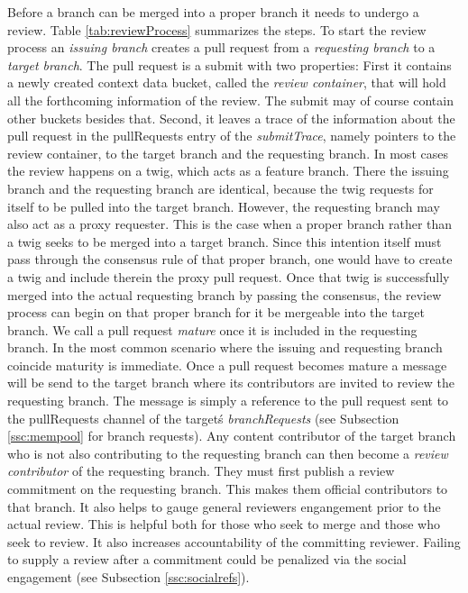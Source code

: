 \documentclass[14pt]{article}
\begin{document}
Before a branch can be merged into a proper branch it needs to undergo a review. Table \ref{tab:reviewProcess} summarizes the steps.
To start the review process an \textit{issuing branch} creates a pull request from a \textit{requesting branch} to a \textit{target branch}. The pull request is a submit with two properties: First it contains a newly created context data bucket, called the \textit{review container}, that will hold all the forthcoming information of the review. The submit may of course contain other buckets besides that. Second, it leaves a trace of the information about the pull request in the pullRequests entry of the \textit{submitTrace}, namely pointers to the review container, to the target branch and the requesting branch. In most cases the review happens on a twig, which acts as a feature branch. There the issuing branch and the requesting branch are identical, because the twig requests for itself to be pulled into the target branch. However, the requesting branch may also act as a proxy requester. This is the case when a proper branch rather than a twig seeks to be merged into a target branch. Since this intention itself must pass through the consensus rule of that proper branch, one would have to create a twig and include therein the proxy pull request. Once that twig is successfully merged into the actual requesting branch by passing the consensus, the review process can begin on that proper branch for it be mergeable into the target branch. We call a pull request \textit{mature} once it is included in the requesting branch. In the most common scenario where the issuing and requesting branch coincide maturity is immediate. 
Once a pull request becomes mature a message will be send to the target branch  where its contributors are invited to review the requesting branch. The message is simply a reference to the pull request sent to the pullRequests channel of the target\'s \textit{branchRequests} (see Subsection \ref{ssc:mempool} for branch requests).
Any content contributor of the target branch who is not also contributing to the requesting branch can then become a \textit{review contributor} of the requesting branch. They must first publish a review commitment on the requesting branch. This makes them official contributors to that branch. It also helps to gauge general reviewers engangement prior to the actual review. This is helpful both for those who seek to merge and those who seek to review. It also increases accountability of the committing reviewer. Failing to supply a review after a commitment could be penalized via the social engagement (see Subsection \ref{ssc:socialrefs}).  
\end{document}
